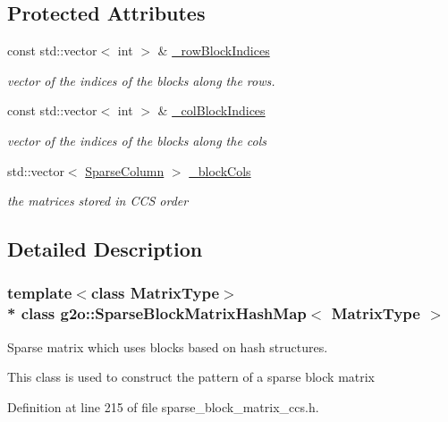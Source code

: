 \subsection*{Protected Attributes}
\begin{DoxyCompactItemize}
\item 
const std\+::vector$<$ int $>$ \& \hyperlink{classg2o_1_1SparseBlockMatrixHashMap_ab002c32872fbce7d3485a5032eaee0de}{\+\_\+row\+Block\+Indices}
\begin{DoxyCompactList}\small\item\em vector of the indices of the blocks along the rows. \end{DoxyCompactList}\item 
const std\+::vector$<$ int $>$ \& \hyperlink{classg2o_1_1SparseBlockMatrixHashMap_a1def3b2ef5c5ee646d831cda7b1954be}{\+\_\+col\+Block\+Indices}
\begin{DoxyCompactList}\small\item\em vector of the indices of the blocks along the cols \end{DoxyCompactList}\item 
std\+::vector$<$ \hyperlink{classg2o_1_1SparseBlockMatrixHashMap_ae364a722296b90e32dd6c3a8fbeb49ae}{Sparse\+Column} $>$ \hyperlink{classg2o_1_1SparseBlockMatrixHashMap_ae54514ce47f9cf1e54455d1f0adceb23}{\+\_\+block\+Cols}
\begin{DoxyCompactList}\small\item\em the matrices stored in C\+CS order \end{DoxyCompactList}\end{DoxyCompactItemize}


\subsection{Detailed Description}
\subsubsection*{template$<$class Matrix\+Type$>$\\*
class g2o\+::\+Sparse\+Block\+Matrix\+Hash\+Map$<$ Matrix\+Type $>$}

Sparse matrix which uses blocks based on hash structures. 

This class is used to construct the pattern of a sparse block matrix 

Definition at line 215 of file sparse\+\_\+block\+\_\+matrix\+\_\+ccs.\+h.



